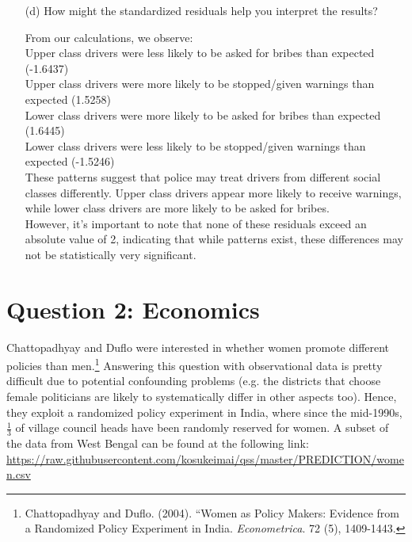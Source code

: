 \documentclass[12pt,letterpaper]{article}
\begin{document}
\begin{enumerate}
\begin{table}[h]
\begin{tabular}{l | c c c }
		\end{tabular}
	\end{table}
	
	
	\newpage
	\item [(d)] How might the standardized residuals help you interpret the results?  \\
	\vspace{1cm}
	
	From our calculations, we observe:\\
	
	Upper class drivers were less likely to be asked for bribes than expected (-1.6437)\\
	Upper class drivers were more likely to be stopped/given warnings than expected (1.5258)\\
	Lower class drivers were more likely to be asked for bribes than expected (1.6445)\\
	Lower class drivers were less likely to be stopped/given warnings than expected (-1.5246)\\
	
	These patterns suggest that police may treat drivers from different social classes differently. Upper class drivers appear more likely to receive warnings, while lower class drivers are more likely to be asked for bribes.\\
	However, it's important to note that none of these residuals exceed an absolute value of 2, indicating that while patterns exist, these differences may not be statistically very significant.
	
\end{enumerate}
\newpage

\section*{Question 2: Economics}
Chattopadhyay and Duflo were interested in whether women promote different policies than men.\footnote{Chattopadhyay and Duflo. (2004). ``Women as Policy Makers: Evidence from a Randomized Policy Experiment in India. \textit{Econometrica}. 72 (5), 1409-1443.} Answering this question with observational data is pretty difficult due to potential confounding problems (e.g. the districts that choose female politicians are likely to systematically differ in other aspects too). Hence, they exploit a randomized policy experiment in India, where since the mid-1990s, $\frac{1}{3}$ of village council heads have been randomly reserved for women. A subset of the data from West Bengal can be found at the following link: \url{https://raw.githubusercontent.com/kosukeimai/qss/master/PREDICTION/women.csv}\\
\end{document}
